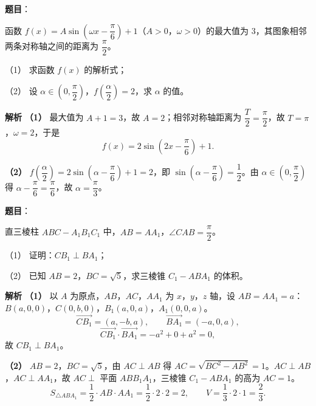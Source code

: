 \begin{answer}

\textbf{题目}：

函数 $f(x)=A\sin\left(\omega x-\dfrac\pi6\right)+1$（$A>0$，$\omega>0$）的最大值为 $3$，其图象相邻两条对称轴之间的距离为 $\dfrac\pi2$。

（1） 求函数 $f(x)$ 的解析式；

（2） 设 $\alpha\in\left(0,\dfrac\pi2\right)$，$f\left(\dfrac\alpha2\right)=2$，求 $\alpha$ 的值。

\textbf{解析}
\textbf{（1）} 最大值为 $A+1=3$，故 $A=2$；相邻对称轴距离为 $\dfrac T2=\dfrac\pi2$，故 $T=\pi$，$\omega=2$，于是
\nopagebreak[4]
\[f(x)=2\sin\left(2x-\frac\pi6\right)+1.\]

\textbf{（2）} $f\left(\dfrac\alpha2\right)=2\sin\left(\alpha-\dfrac\pi6\right)+1=2$，即 $\sin\left(\alpha-\dfrac\pi6\right)=\dfrac12$。由 $\alpha\in\left(0,\dfrac\pi2\right)$ 得 $\alpha-\dfrac\pi6=\dfrac\pi6$，故 $\alpha=\dfrac\pi3$。



\end{answer}
\begin{answer}

\textbf{题目}：

直三棱柱 $ABC-A_1B_1C_1$ 中，$AB=AA_1$，$\angle CAB=\dfrac\pi2$。

（1） 证明：$CB_1\perp BA_1$；

（2） 已知 $AB=2$，$BC=\sqrt5$，求三棱锥 $C_1-ABA_1$ 的体积。
\nopagebreak[4]
\begin{center}\end{center}
\nopagebreak[4]
\textbf{解析}
\textbf{（1）} 以 $A$ 为原点，$AB$，$AC$，$AA_1$ 为 $x$，$y$，$z$ 轴，设 $AB=AA_1=a$：$B(a,0,0)$，$C(0,b,0)$，$B_1(a,0,a)$，$A_1(0,0,a)$。
\nopagebreak[4]
\[\overrightarrow{CB_1}=(a,-b,a),\qquad\overrightarrow{BA_1}=(-a,0,a),\]
\nopagebreak[4]
\[\overrightarrow{CB_1}\cdot\overrightarrow{BA_1}=-a^2+0+a^2=0,\]
故 $CB_1\perp BA_1$。

\textbf{（2）} $AB=2$，$BC=\sqrt5$，由 $AC\perp AB$ 得 $AC=\sqrt{BC^2-AB^2}=1$。$AC\perp AB$，$AC\perp AA_1$，故 $AC\perp$ 平面 $ABB_1A_1$，三棱锥 $C_1-ABA_1$ 的高为 $AC=1$。
\nopagebreak[4]
\[S_{\triangle ABA_1}=\frac12\cdot AB\cdot AA_1=\frac12\cdot2\cdot2=2,\qquad V=\frac13\cdot2\cdot1=\frac23.\]



\end{answer}
